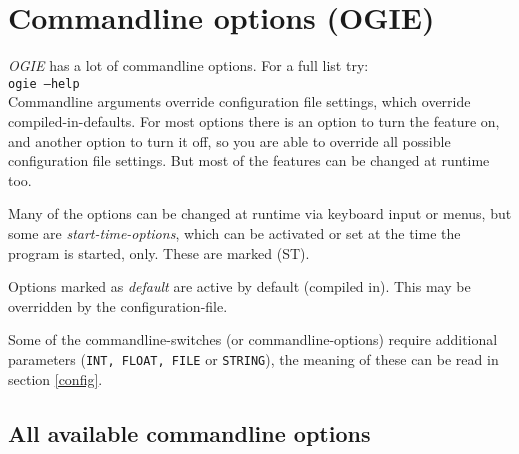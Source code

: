 

\section{Commandline options (OGIE)}
\label{cmdline}

\emph{OGIE} has a lot of commandline options. For a full list try:\\
\texttt{ogie --help} \\
Commandline arguments override configuration file settings, which override
compiled-in-defaults. For most options there is an option to turn the feature on, and another option to turn it off, so you are able to override all
possible configuration file settings. But most of the features can be changed at runtime too.

Many of the options can be changed at runtime via keyboard input or menus, but some are \emph{start-time-options}, which can be activated or set at the time the program is started, only.
These are marked (ST).

Options marked as \emph{default} are active by default (compiled in). This may be overridden by the configuration-file.

Some of the commandline-switches (or commandline-options) require  additional parameters (\texttt{INT, FLOAT, FILE} or \texttt{STRING}), the meaning of these can be read in section \ref{config}.

\subsection{All available commandline options}

